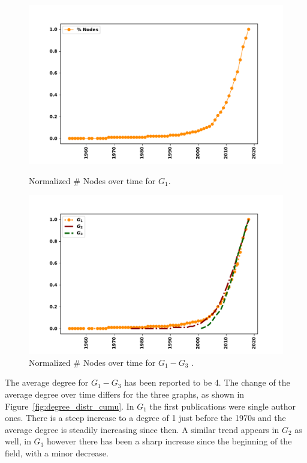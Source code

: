 \documentclass{article}
\theoremstyle{definition}
\begin{document}
\begin{figure}[!hbtp]
    \begin{minipage}{.45\textwidth}
        \centering
        \includegraphics[width=\textwidth]{./assets/images/nodes_percentage_over_time.pdf}
        \caption{Normalized \# Nodes over time for \(G_1\).}\label{fig:nodes_cumu_pd}
    \end{minipage}%
    \begin{minipage}{.45\textwidth}
        \centering
        \includegraphics[width=\textwidth]{./assets/images/percentage_networks_nodes.pdf}
        \caption{Normalized \# Nodes over time for \(G_1-G_3\) .}\label{fig:nodes_cumu}
    \end{minipage}
\end{figure}

The average degree for \(G_1 - G_3\) has been reported to be 4. The change of the
average degree over time differs for the three graphs, as shown in Figure~\ref{fig:degree_distr_cumu}.
In \(G_1\) the first publications were single author ones. There is a steep increase
to a degree of 1 just before the 1970s and the average degree is steadily increasing
since then. A similar trend appears in \(G_2\) as well, in \(G_3\) however
there has been a sharp increase since the beginning of the field, with
a minor decrease.
\end{document}
